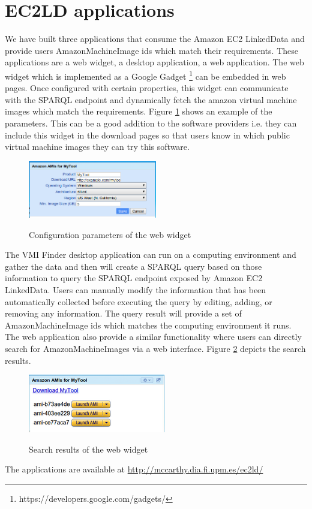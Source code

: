 \section{EC2LD applications}\label{sec:apps}
We have built three applications that consume the Amazon EC2 LinkedData and provide users AmazonMachineImage ids which match their requirements. These applications are a web widget, a desktop application, a web application. The web widget which is implemented as a Google Gadget \footnote{https://developers.google.com/gadgets/} can be embedded in web pages. Once configured with certain properties, this widget can communicate with the SPARQL endpoint and dynamically fetch the amazon virtual machine images which match the requirements. Figure \ref{fig:config} shows an example of the parameters. This can be a good addition to the software providers i.e. they can include this widget in the download pages so that users know in which public virtual machine images they can try this software.

\begin{figure}[h!t!]
  \caption{Configuration parameters of the web widget}
  \centering
    \includegraphics[width=0.5\textwidth]{gadget-config.png}
   \label{fig:config}
\end{figure}

The VMI Finder desktop application can run on a computing environment and gather the data and then will create a SPARQL query based on those information to query the SPARQL endpoint exposed by Amazon EC2 LinkedData. Users can manually modify the information that has been automatically collected before executing the query by editing, adding, or removing any information. The query result will provide a set of AmazonMachineImage ids which matches the computing environment it runs. The web application also provide a similar functionality where users can directly search for AmazonMachineImages via a web interface. Figure \ref{fig:results} depicts the search results.

\begin{figure}[h!t!]
  \caption{Search results of the web widget}
  \centering
    \includegraphics[scale=0.8]{gadget-results.png}
   \label{fig:results}
\end{figure}

The applications are available at \url{http://mccarthy.dia.fi.upm.es/ec2ld/}